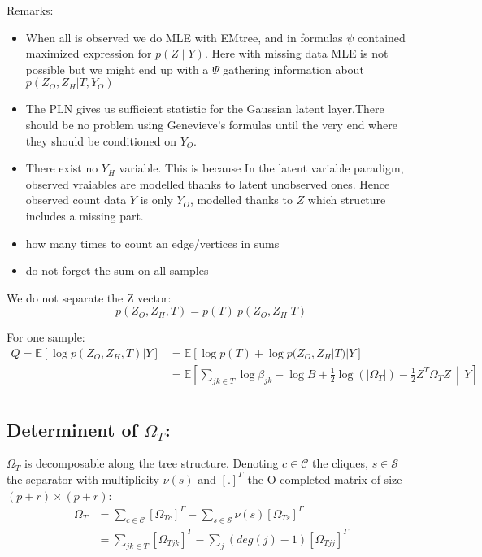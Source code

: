 \documentclass[11pt,a4paper]{article}
\newcommand{\Esp}{\mathds{E}}
\begin{document}
Remarks:
\begin{itemize}
\item When all is observed we do MLE with EMtree, and in formulas $\psi$ contained maximized expression for $p(Z \mid Y)$. Here with missing data MLE is not possible but we might end up with a $\Psi$ gathering information about $ p(Z_O,Z_H|T,Y_O)$
\item The PLN gives us sufficient statistic for the Gaussian latent layer.There should be no problem using Genevieve's formulas until the very end where they should be conditioned on $Y_O$.
\item There exist no $Y_H$ variable. This is because In the latent variable paradigm, observed vraiables are modelled thanks to latent unobserved ones. Hence observed count data $Y$ is only $Y_O$, modelled thanks to $Z$ which structure includes a  missing part.
\item how many times to count an edge/vertices in sums 
\item do not forget the sum on all samples
\end{itemize}



We do not separate the Z vector:
$$p(Z_O,Z_H,T) = p(T) \: p(Z_O,Z_H|T)$$

For one sample:
\begin{align*}
Q= \Esp[\log p(Z_O,Z_H,T) | Y ] &=  \Esp[\log p(T)+\log p(Z_O,Z_H|T)|Y] \\
  &=\Esp\left[\sum_{jk \in T} \log \beta_{jk} - \log B + \frac{1}{2} \log(|\Omega_T|) - \frac{1}{2} Z^T \Omega_T Z\,\middle\vert\,  Y\right]\\
\end{align*} 


\subsection{Determinent of $\Omega_T$:\\}
$\Omega_T$ is decomposable along the tree structure. Denoting $c\in\mathcal{C}$ the cliques, $s\in \mathcal{S}$ the separator with multiplicity $\nu(s)$ and $[.]^\Gamma$ the O-completed matrix of size $(p+r)\times(p+r)$:
\begin{align*}
\Omega_T &= \sum_{c\in \mathcal{C}} [\Omega_{Tc}]^\Gamma - \sum_{s \in\mathcal{S}} \nu(s)[\Omega_{Ts}]^\Gamma\\
&= \sum_{jk \in T} [\Omega_{Tjk}]^\Gamma - \sum_j (deg(j)-1)[\Omega_{Tjj}]^\Gamma
\end{align*}
\end{document}
